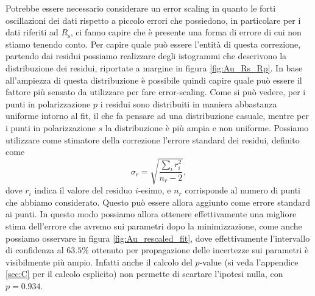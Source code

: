 \documentclass[
    prb,altaffilletter,citeautoscript,
    amsmath,amssymb,
    showpacs,showkeys,floatfix,
    reprint
]{revtex4-1}
\begin{document}
Potrebbe essere necessario considerare un error scaling in quanto le forti oscillazioni dei dati rispetto a piccolo errori che possiedono, in particolare per i dati riferiti ad $R_\mathrm{s}$, ci fanno capire che è presente una forma di errore di cui non stiamo tenendo conto. Per capire quale può essere l'entità di questa correzione, partendo dai residui possiamo realizzare degli istogrammi che descrivono la distribuzione dei residui, riportate a margine in figura \ref{fig:Au_Rs_Rp}. In base all'ampiezza di questa distribuzione è possibile quindi capire quale può essere il fattore più sensato da utilizzare per fare error-scaling. Come si può vedere, per i punti in polarizzazione $p$ i residui sono distribuiti in maniera abbastanza uniforme intorno al fit, il che fa pensare ad una distribuzione casuale, mentre per i punti in polarizzazione $s$ la distribuzione è più ampia e non uniforme. Possiamo utilizzare come stimatore della correzione l'errore standard dei residui, definito come \begin{equation}
    \sigma_r = \sqrt{\frac{\sum_i r_i^2}{n_r-2}}, 
\end{equation} dove $r_i$ indica il valore del residuo $i$-esimo, e $n_r$ corrisponde al numero di punti che abbiamo considerato. Questo può essere allora aggiunto come errore standard ai punti. In questo modo possiamo allora ottenere effettivamente una migliore stima dell'errore che avremo sui parametri dopo la minimizzazione, come anche possiamo osservare in figura \ref{fig:Au_rescaled_fit}, dove effettivamente l'intervallo di confidenza al $63.5\%$ ottenuto per propagazione delle incertezze sui parametri è visibilmente più ampio. Infatti anche il calcolo del $p$-value (si veda l'appendice \ref{sec:C} per il calcolo esplicito) non permette di scartare l'ipotesi nulla, con $p=0.934$.
\end{document}
